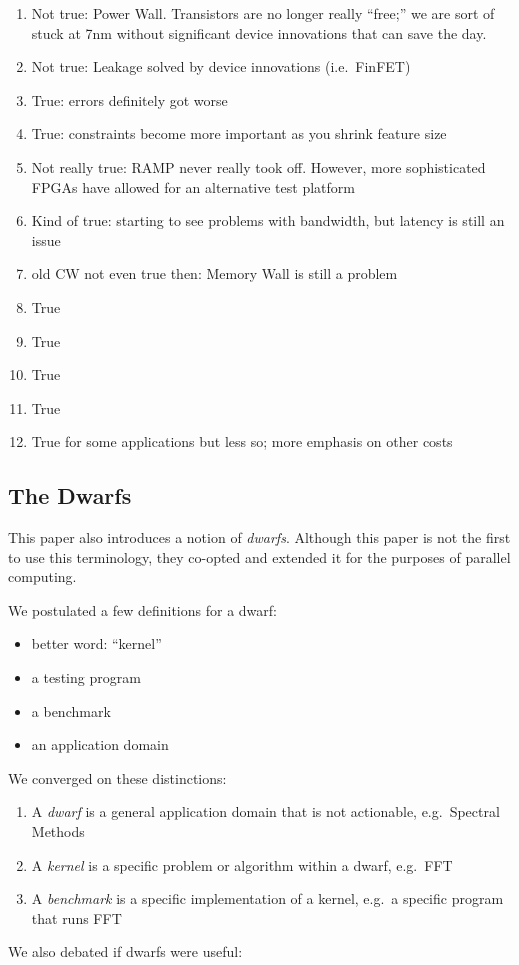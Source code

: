 \begin{enumerate}
    \item Not true: Power Wall. Transistors are no longer really ``free;''  we are sort of stuck at 7nm without significant device innovations that can save the day.
    \item Not true: Leakage solved by device innovations (i.e.\ FinFET)
    \item True: errors definitely got worse
    \item True: constraints become more important as you shrink feature size
    \item Not really true: RAMP never really took off. However, more sophisticated FPGAs have allowed for an alternative test platform
    \item Kind of true: starting to see problems with bandwidth, but latency is still an issue
    \item old CW not even true then: Memory Wall is still a problem
    \item True
    \item True
    \item True
    \item True
    \item True for some applications but less so; more emphasis on other costs
\end{enumerate}

\subsection{The Dwarfs}\label{feb-11:a-view:dwarfs}

This paper also introduces a notion of \textit{dwarfs}.
Although this paper is not the first to use this terminology, they co-opted and extended it for the purposes of parallel computing.

We postulated a few definitions for a dwarf:
\begin{itemize}
    \item better word: ``kernel''
    \item a testing program
    \item a benchmark
    \item an application domain
\end{itemize}
We converged on these distinctions:
\begin{enumerate}
    \item A \textit{dwarf} is a general application domain that is not actionable, e.g.\ Spectral Methods
    \item A \textit{kernel} is a specific problem or algorithm within a dwarf, e.g.\ FFT
    \item A \textit{benchmark} is a specific implementation of a kernel, e.g.\ a specific program that runs FFT
\end{enumerate}
We also debated if dwarfs were useful:

